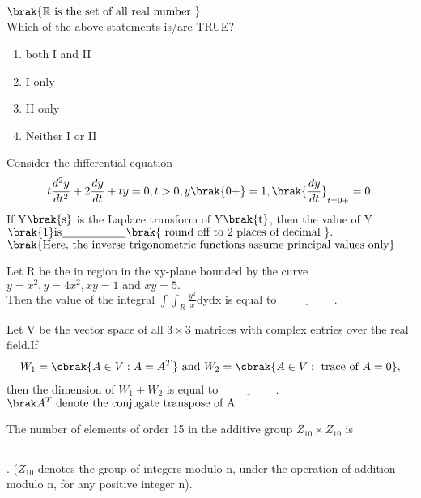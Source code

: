 $\brak{\mathbb{R} \text{ is the set of all real number }}$\\
Which of the above statements is/are TRUE?
\begin{multicols}{2}
    \begin{enumerate}
         \item  both I and II  
         \item I  only 
         \item II  only 
        \item  Neither I or II 
    \end{enumerate}
\end{multicols}   
\bigskip
\item Consider the differential equation
\begin{align*}
    t\frac{d^{2}y}{dt^{2}}+2\frac{dy}{dt}+ty=0,t>0,y\brak{0+}=1,\brak{\frac{dy}{dt}}_{t=0+}=0.
\end{align*}
 If Y$\brak{\text{s}}$ is the Laplace transform of Y$\brak{\text{t}}$, then the value of Y$\brak{1} \text{is} \underline{\hspace{2cm}}\brak{\text{ round off to 2 places of decimal }}.$\\
 $\brak{\text{Here, the inverse trigonometric functions assume principal values only}}$
 \bigskip
 \item Let R be the in region in the xy-plane bounded by the curve 
 $y=x^{2},y=4x^{2},xy=1\text{ and } xy=5.$\\
 Then the value of the integral $\int\int_{R}\frac{y^{2}}{x}$dydx is equal to $\underline{\hspace{2cm}}.$
\bigskip
\item Let V be the vector space of all $3\times3$ matrices with complex entries over the real field.If
\begin{align*}
    W_{1}=\cbrak{A\in V:A=A^{T}} \text{ and } W_{2}=\cbrak{A\in V: \text{ trace of }A=0},
\end{align*}
then the dimension of $W_{1} + W_{2}$ is equal to $\underline{\hspace{2cm}}.$
$\brak A^{T}{\text{ denote the conjugate transpose of A}}$
\bigskip
\item The number of elements of order 15 in the additive group $Z_{10}\times Z_{10}$ is \rule{1cm}{0.15mm}. ($Z_{10}$ denotes the group of integers modulo n, under the operation of addition modulo n, for any positive integer n).


